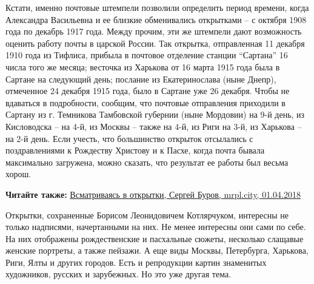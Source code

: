 Кстати, именно почтовые штемпели позволили определить период времени, когда
Александра Васильевна и ее близкие обменивались открытками – с октября 1908
года по декабрь 1917 года. Между прочим, эти же штемпели дают возможность
оценить работу почты в царской России. Так открытка, отправленная 11 декабря
1910 года из Тифлиса, прибыла в почтовое отделение станции \enquote{Сартана} 16 числа
того же месяца; весточка из Харькова от 16 марта 1915 года была в Сартане на
следующий день; послание из Екатеринослава (ныне Днепр), отмеченное 24 декабря
1915 года, было в Сартане уже 26 декабря. Чтобы не вдаваться в подробности,
сообщим, что почтовые отправления приходили в Сартану из г. Темникова
Тамбовской губернии (ныне Мордовии) на 9-й день, из Кисловодска – на 4-й, из
Москвы – также на 4-й, из Риги на 3-й, из Харькова – на 2-й день. Если учесть,
что большинство открыток отсылались с поздравлениями к Рождеству Христову и к
Пасхе, когда почта бывала максимально загружена, можно сказать, что результат
ее работы был весьма хорош.

\textbf{Читайте также:} \href{https://mrpl.city/blogs/view/vsmatrivayas-v-otkrytki}{%
Всматриваясь в открытки, Сергей Буров, mrpl.city, 01.04.2018}

Открытки, сохраненные Борисом Леонидовичем Котлярчуком, интересны не только
надписями, начертанными на них. Не менее интересны они сами по себе. На них
отображены рождественские и пасхальные сюжеты, несколько слащавые женские
портреты, а также пейзажи. А еще виды Москвы, Петербурга, Харькова, Риги, Ялты
и других городов. Есть и репродукции картин знаменитых художников, русских и
зарубежных. Но это уже другая тема.
